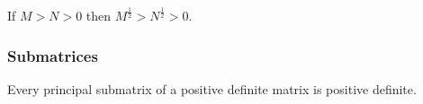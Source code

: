 If \(M > N > 0\) then \(M^\frac{1}{2} > N^\frac{1}{2} > 0\).

\hypertarget{submatrices}{%
\subsubsection{Submatrices}\label{submatrices}}

Every principal submatrix of a positive definite matrix is positive
definite.

%
%
%
%
%
%

%
%
%

